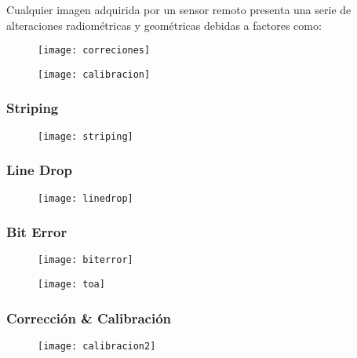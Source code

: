 \documentclass[14pt]{beamer}
\begin{document}
\begin{frame}
\small{Cualquier imagen adquirida por un sensor remoto presenta una serie de alteraciones radiométricas y geométricas debidas a factores como:}
  \begin{figure}
    \centering
    \texttt{[image: correciones]}
  \end{figure}
\end{frame}
\begin{frame}
\scriptsize{}
  \begin{figure}
    \centering
    \texttt{[image: calibracion]}
  \end{figure}
\end{frame}
\begin{frame}
\frametitle{Striping}
\scriptsize{}
  \begin{figure}
    \centering
    \texttt{[image: striping]}
  \end{figure}
\end{frame}
\begin{frame}
\frametitle{Line Drop}
\scriptsize{}
  \begin{figure}
    \centering
    \texttt{[image: linedrop]}
  \end{figure}
\end{frame}
\begin{frame}
\frametitle{Bit Error}
\scriptsize{}
  \begin{figure}
    \centering
    \texttt{[image: biterror]}
  \end{figure}
\end{frame}
\begin{frame}
\scriptsize{}
  \begin{figure}
    \centering
    \texttt{[image: toa]}
     \end{figure}
\end{frame}
\begin{frame}
\frametitle{Corrección \& Calibración}
\scriptsize{}
  \begin{figure}
    \centering
    \texttt{[image: calibracion2]}
     \end{figure}
\end{frame}
\end{document}
